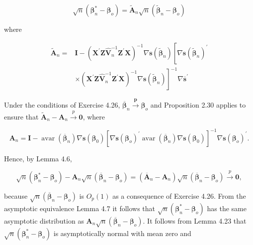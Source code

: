 \documentclass[10pt]{article}
\begin{document}
$$
\sqrt{n}\left(\boldsymbol{\beta}_{n}^{*}-\boldsymbol{\beta}_{o}\right)=\tilde{\mathbf{A}}_{n} \sqrt{n}\left(\tilde{\boldsymbol{\beta}}_{n}-\boldsymbol{\beta}_{o}\right)
$$

where

$$
\begin{aligned}
\tilde{\mathbf{A}}_{n}= & \mathbf{I}-\left(\mathbf{X}^{\prime} \mathbf{Z} \hat{\mathbf{V}}_{n}^{-1} \mathbf{Z}^{\prime} \mathbf{X}\right)^{-1} \nabla \mathbf{s}\left(\tilde{\boldsymbol{\beta}}_{n}\right)\left[\nabla \mathbf{s}\left(\tilde{\boldsymbol{\beta}}_{n}\right)^{\prime}\right. \\
& \left.\times\left(\mathbf{X}^{\prime} \mathbf{Z} \hat{\mathbf{V}}_{n}^{-1} \mathbf{Z}^{\prime} \mathbf{X}\right)^{-1} \nabla \mathbf{s}\left(\tilde{\boldsymbol{\beta}}_{n}\right)\right]^{-1} \nabla \overline{\mathbf{s}}^{\prime}
\end{aligned}
$$

Under the conditions of Exercise 4.26, $\overline{\boldsymbol{\beta}}_{n} \xrightarrow{\boldsymbol{p}} \boldsymbol{\beta}_{o}$ and Proposition 2.30 applies to ensure that $\tilde{\mathbf{A}}_{n}-\mathbf{A}_{n} \xrightarrow{p} \mathbf{0}$, where

$$
\mathbf{A}_{n}=\mathbf{I}-\operatorname{avar}\left(\overline{\boldsymbol{\beta}}_{n}\right) \nabla \mathbf{s}\left(\boldsymbol{\beta}_{0}\right)\left[\nabla \mathbf{s}\left(\boldsymbol{\beta}_{o}\right)^{\prime} \operatorname{avar}\left(\overline{\boldsymbol{\beta}}_{n}\right) \nabla \mathbf{s}\left(\boldsymbol{\beta}_{0}\right)\right]^{-1} \nabla \mathbf{s}\left(\boldsymbol{\beta}_{o}\right)^{\prime} .
$$

Hence, by Lemma 4.6,

$$
\sqrt{n}\left(\boldsymbol{\beta}_{n}^{*}-\boldsymbol{\beta}_{o}\right)-\mathbf{A}_{n} \sqrt{n}\left(\overline{\boldsymbol{\beta}}_{n}-\boldsymbol{\beta}_{o}\right)=\left(\overline{\mathbf{A}}_{n}-\mathbf{A}_{n}\right) \sqrt{n}\left(\overline{\boldsymbol{\beta}}_{n}-\boldsymbol{\beta}_{o}\right) \xrightarrow{p} \mathbf{0},
$$

because $\sqrt{n}\left(\overline{\boldsymbol{\beta}}_{n}-\boldsymbol{\beta}_{o}\right)$ is $O_{p}(1)$ as a consequence of Exercise 4.26. From the asymptotic equivalence Lemma 4.7 it follows that $\sqrt{n}\left(\boldsymbol{\beta}_{n}^{*}-\boldsymbol{\beta}_{o}\right)$ has the same asymptotic distribution as $\mathbf{A}_{n} \sqrt{n}\left(\overline{\boldsymbol{\beta}}_{n}-\boldsymbol{\beta}_{o}\right)$. It follows from Lemma 4.23 that $\sqrt{n}\left(\boldsymbol{\beta}_{n}^{*}-\boldsymbol{\beta}_{o}\right)$ is asymptotically normal with mean zero and
\end{document}
